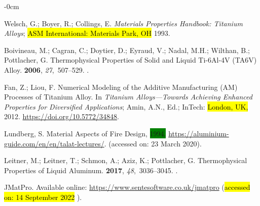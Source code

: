\documentclass[metals,article,accept,pdftex,moreauthors]{Definitions/mdpi}
\begin{document}
\begin{adjustwidth}{-\extralength}{0cm}
\begin{thebibliography}{999}
Welsch, G.; Boyer, R.; Collings, E.
{\em Materials Properties Handbook: Titanium Alloys};
\hl{ASM International: Materials Park, OH} %
1993.

Boivineau, M.; Cagran, C.; Doytier, D.; Eyraud, V.; Nadal, M.H.; Wilthan, B.; Pottlacher, G.
\newblock Thermophysical {{Properties}} of {{Solid}} and {{Liquid Ti-6Al-4V}}
({{TA6V}}) {{Alloy}}.
 {\bf 2006}, {\em
  27},~507--529.
.

Fan, Z.; Liou, F.
Numerical Modeling of the Additive Manufacturing (AM) Processes of Titanium Alloy. 
In {\em Titanium Alloys---Towards Achieving Enhanced Properties for Diversified Applications}; 
Amin,  A.N., Ed.; InTech: \hl{London, UK,} 2012.
{\url{https://doi.org/10.5772/34848}}.

Lundberg, S.
Material Aspects of Fire Design, \colorbox{green}{1994.} %
{\url{https://aluminium-guide.com/en/en/talat-lectures/}}.
({accessed on: 23 March 2020}).

Leitner, M.; Leitner, T.; Schmon, A.; Aziz, K.; Pottlacher, G.
\newblock Thermophysical {{Properties}} of {{Liquid Aluminum}}.
 {\bf 2017}, {\em
  48},~3036--3045.
.

JMatPro.
Available online: \url{https://www.sentesoftware.co.uk/jmatpro} (\hl{accessed on: 14 September 2022}%
).


\end{thebibliography}
\end{adjustwidth}
\end{document}
